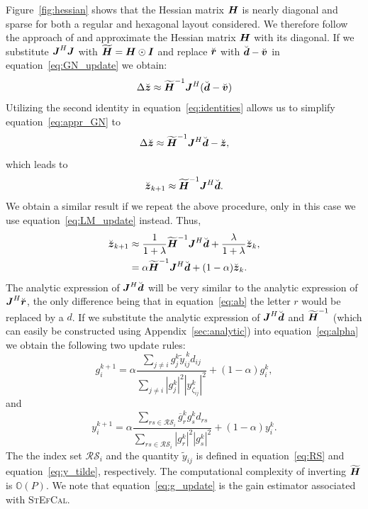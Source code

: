\documentclass[useAMS,usenatbib]{mn2e}
\newcommand{\bz}{\bmath{z}}
\newcommand{\br}{\bmath{r}}
\newcommand{\bd}{\bmath{d}}
\newcommand{\bv}{\bmath{v}}
\newcommand{\bJ}{\bmath{J}}
\newcommand{\bH}{\bmath{H}}
\newcommand{\bI}{\bmath{I}}
\newcommand{\conj}[1]{\overline{#1}}
\begin{document}
Figure~\ref{fig:hessian} shows that the Hessian matrix $\bH$ is nearly diagonal and sparse for both a regular and hexagonal layout considered. We therefore follow the approach of \citet{Smirnov2015} and approximate the Hessian matrix $\bH$ with its diagonal. If we substitute $\bJ^H\bJ$ with $\widetilde{\bH}=\bH\odot\bI$ and replace $\breve{\br}$ with $\breve{\bd} - \breve{\bv}$ in equation~\ref{eq:GN_update} we obtain:
\begin{equation}
\label{eq:appr_GN}
 \Delta \breve{\bz} \approx \widetilde{\bH}^{-1}\bJ^H(\breve{\bd}-\breve{\bv})
\end{equation}
Utilizing the second identity in equation~\ref{eq:identities} allows us to simplify equation~\ref{eq:appr_GN} to
\begin{equation}
  \Delta \breve{\bz} \approx \widetilde{\bH}^{-1}\bJ^H\breve{\bd}-\breve{\bz},
\end{equation}
which leads to
\begin{equation}
 \breve{\bz}_{k+1} \approx \widetilde{\bH}^{-1}\bJ^H\breve{\bd}.
\end{equation}
We obtain a similar result if we repeat the above procedure, only in this case we use equation~\ref{eq:LM_update} instead. Thus,
\begin{align}
\breve{\bz}_{k+1} &\approx \frac{1}{1+\lambda}\widetilde{\bH}^{-1}\bJ^H\breve{\bd} + \frac{\lambda}{1+\lambda} \breve{\bz}_k,\label{eq:lambda}\\
 &= \alpha \widetilde{\bH}^{-1}\bJ^H\breve{\bd} + (1-\alpha)\breve{\bz}_k. \label{eq:alpha}  
\end{align}
The analytic expression of $\bJ^H\breve{\bd}$ will be very similar to the analytic 
expression of $\bJ^H\breve{\br}$, the only difference being that in equation~\ref{eq:ab} the letter $r$ would be replaced by a $d$. If we substitute the analytic expression
of $\bJ^H\breve{\bd}$ and $\widetilde{\bH}^{-1}$ (which can easily be constructed using Appendix~\ref{sec:analytic}) into equation~\ref{eq:alpha} we obtain the following two update rules:
\begin{equation}
\label{eq:g_update}
g_{i}^{k+1} = \alpha \frac{\sum_{j\neq i} g_j^k \widetilde{y}_{ij}^{~\!\!k} d_{ij}}{\sum_{j\neq i} |g_j^k|^2|y_{\zeta_{ij}}^k|^2} + (1-\alpha) g_i^k, 
\end{equation}
and
\begin{equation}
\label{eq:y_update}
y_{i}^{k+1} = \alpha \frac{\sum_{rs \in \mathcal{RS}_i} \conj{g}_r^k g_s^k d_{rs}}{\sum_{rs \in \mathcal{RS}_i}|g_r^k|^2|g_s^k|^2} + (1-\alpha) y_i^k. 
\end{equation}
The the index set $\mathcal{RS}_i$ and the quantity $\widetilde{y}_{ij}$ is defined in equation~\ref{eq:RS} and equation~\ref{eq:y_tilde}, respectively. 
The computational complexity of inverting $\widetilde{\bH}$ is $\mathbb{O}(P)$. We note that equation~\ref{eq:g_update} is the gain estimator associated with \textsc{StEfCal}.
\end{document}
